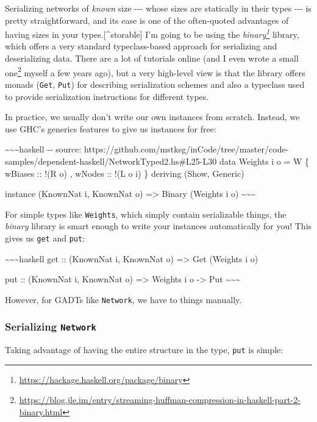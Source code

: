 \documentclass[]{article}
\renewcommand{\href}[2]{#2\footnote{\url{#1}}}
\begin{document}
Serializing networks of \emph{known} size -\/-\/- whose sizes are statically in
their types -\/-\/- is pretty straightforward, and its ease is one of the
often-quoted advantages of having sizes in your types.{[}\^{}storable{]} I'm
going to be using the
\emph{\href{https://hackage.haskell.org/package/binary}{binary}} library, which
offers a very standard typeclass-based approach for serializing and
deserializing data. There are a lot of tutorials online (and I even
\href{https://blog.jle.im/entry/streaming-huffman-compression-in-haskell-part-2-binary.html}{wrote
a small one} myself a few years ago), but a very high-level view is that the
library offers monads (\texttt{Get}, \texttt{Put}) for describing serialization
schemes and also a typeclass used to provide serialization instructions for
different types.

In practice, we usually don't write our own instances from scratch. Instead, we
use GHC's generics features to give us instances for free:

\textasciitilde{}\textasciitilde{}\textasciitilde{}haskell -\/- source:
https://github.com/mstksg/inCode/tree/master/code-samples/dependent-haskell/NetworkTyped2.hs\#L25-L30
data Weights i o = W \{ wBiases :: !(R o) , wNodes :: !(L o i) \} deriving
(Show, Generic)

instance (KnownNat i, KnownNat o) =\textgreater{} Binary (Weights i o)
\textasciitilde{}\textasciitilde{}\textasciitilde{}

For simple types like \texttt{Weights}, which simply contain serializable
things, the \emph{binary} library is smart enough to write your instances
automatically for you! This gives us \texttt{get} and \texttt{put}:

\textasciitilde{}\textasciitilde{}\textasciitilde{}haskell get :: (KnownNat i,
KnownNat o) =\textgreater{} Get (Weights i o)

put :: (KnownNat i, KnownNat o) =\textgreater{} Weights i o -\textgreater{} Put
\textasciitilde{}\textasciitilde{}\textasciitilde{}

However, for GADTs like \texttt{Network}, we have to things manually.

\subsubsection{\texorpdfstring{Serializing
\texttt{Network}}{Serializing Network}}

Taking advantage of having the entire structure in the type, \texttt{put} is
simple:
\end{document}
